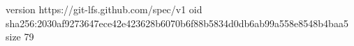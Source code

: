version https://git-lfs.github.com/spec/v1
oid sha256:2030af9273647ece42e423628b6070b6f88b5834d0db6ab99a558e8548b4baa5
size 79
